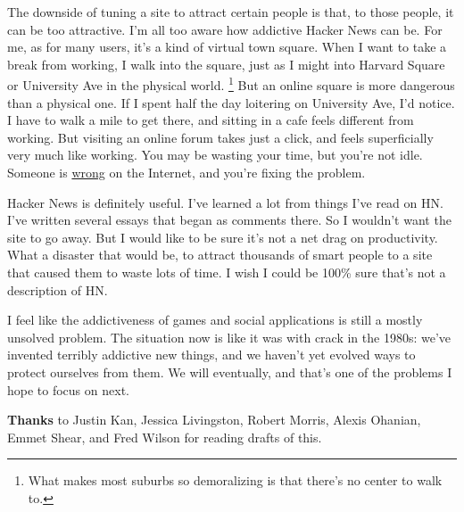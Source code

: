 The downside of tuning a site to attract certain people is that, to
those people, it can be too attractive. I'm all too aware how addictive
Hacker News can be. For me, as for many users, it's a kind of virtual
town square. When I want to take a break from working, I walk into the
square, just as I might into Harvard Square or University Ave in the
physical world. \footnote{What makes most suburbs so demoralizing is that there's no
center to walk to.} But an online square is more
dangerous than a physical one. If I spent half the day loitering on
University Ave, I'd notice. I have to walk a mile to get there, and
sitting in a cafe feels different from working. But visiting an online
forum takes just a click, and feels superficially very much like
working. You may be wasting your time, but you're not idle. Someone is
\href{http://xkcd.com/386/}{wrong} on the Internet, and you're fixing
the problem.

Hacker News is definitely useful. I've learned a lot from things I've
read on HN. I've written several essays that began as comments there. So
I wouldn't want the site to go away. But I would like to be sure it's
not a net drag on productivity. What a disaster that would be, to
attract thousands of smart people to a site that caused them to waste
lots of time. I wish I could be 100\% sure that's not a description of
HN.

I feel like the addictiveness of games and social applications is still
a mostly unsolved problem. The situation now is like it was with crack
in the 1980s: we've invented terribly addictive new things, and we
haven't yet evolved ways to protect ourselves from them. We will
eventually, and that's one of the problems I hope to focus on next.


\textbf{Thanks} to Justin Kan, Jessica Livingston, Robert Morris, Alexis
Ohanian, Emmet Shear, and Fred Wilson for reading drafts of this.